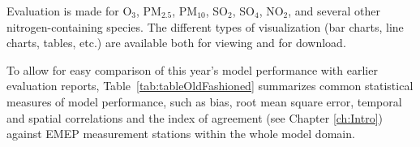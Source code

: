 Evaluation is made for O$_{3}$, PM$_{2.5}$, PM$_{10}$, SO$_{2}$, SO$_{4}$,
NO$_{2}$, and several other nitrogen-containing species.
The different types of visualization (bar charts, line charts, tables,
etc.) are available both for viewing and for download.

\vspace{1cm}

To allow for easy comparison of this year's model performance with earlier evaluation reports, Table~\ref{tab:tableOldFashioned} summarizes common statistical measures of model performance, such as bias, root mean square error, temporal and spatial correlations and the index of agreement (see Chapter \ref{ch:Intro}) against EMEP measurement stations within the whole model domain.

\begin{table}\small



\end{table}
